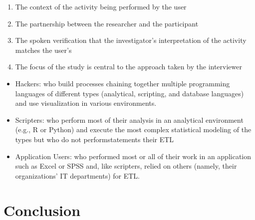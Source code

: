 \documentclass[print]{nuthesis}
\providecommand{\tightlist}{%
  \setlength{\itemsep}{0pt}\setlength{\parskip}{0pt}}
\begin{document}
\begin{enumerate}
\def\labelenumi{\arabic{enumi}.}
\tightlist
\item
  The context of the activity being performed by the user
\item
  The partnership between the researcher and the participant
\item
  The spoken verification that the investigator's interpretation of the activity matches the user's
\item
  The focus of the study is central to the approach taken by the interviewer
\end{enumerate}


\begin{itemize}
\tightlist
\item
  Hackers: who build processes chaining together multiple programming languages of different types (analytical, scripting, and database languages) and use visualization in various environments.
\item
  Scripters: who perform most of their analysis in an analytical environment (e.g., R or Python) and execute the most complex statistical modeling of the types but who do not performstatements their ETL
\item
  Application Users: who performed most or all of their work in an application such as Excel or SPSS and, like scripters, relied on others (namely, their organizations' IT departments) for ETL.
\end{itemize}

\hypertarget{conclusion}{%
\section{Conclusion}\label{conclusion}}
\end{document}
